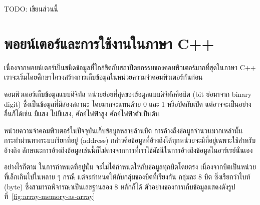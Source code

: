 TODO: เขียน{\wbr}ส่วน{\wbr}นี้{\wbr}

\section{พอยน์เตอร์และ{\wbr}การ{\wbr}ใช้{\wbr}งาน{\wbr}ใน{\wbr}ภาษา C++}
\label{sect:array-pointer-c}

เนื่องจาก{\wbr}พอยน์เตอร์{\wbr}เป็น{\wbr}ชนิด{\wbr}ข้อมูล{\wbr}ที่{\wbr}ใกล้ชิด{\wbr}กับ{\wbr}สถาปัตยกรรม{\wbr}ของ{\wbr}คอมพิวเตอร์{\wbr}มาก{\wbr}ที่สุด{\wbr}ใน{\wbr}ภาษา{\wbr}
C++ เรา{\wbr}จะ{\wbr}เริ่ม{\wbr}โดย{\wbr}ศึกษา{\wbr}โครงสร้าง{\wbr}การ{\wbr}เก็บ{\wbr}ข้อมูล{\wbr}ใน{\wbr}หน่วยความจำ{\wbr}คอมพิวเตอร์{\wbr}กัน{\wbr}ก่อน{\wbr}

คอมพิวเตอร์{\wbr}เก็บ{\wbr}ข้อมูล{\wbr}แบบ{\wbr}ดิจิทัล หน่วย{\wbr}ย่อย{\wbr}ที่สุด{\wbr}ของ{\wbr}ข้อมูล{\wbr}แบบ{\wbr}ดิจิทัล{\wbr}คือ{\wbr}บิต (bit ย่อ{\wbr}มา{\wbr}จาก{\wbr}
binary digit) ซึ่ง{\wbr}เป็น{\wbr}ข้อมูล{\wbr}ที่{\wbr}มี{\wbr}สอง{\wbr}สถานะ โดยมาก{\wbr}จะ{\wbr}แทน{\wbr}ด้วย 0 และ 1 หรือ{\wbr}ปิด{\wbr}กับ{\wbr}เปิด{\wbr}
แต่{\wbr}อาจ{\wbr}จะ{\wbr}เป็น{\wbr}อย่าง{\wbr}อื่น{\wbr}ก็ได้{\wbr}เช่น มี{\wbr}แสง ไม่{\wbr}มี{\wbr}แสง, ศักย์{\wbr}ไฟฟ้า{\wbr}สูง ศักย์{\wbr}ไฟฟ้า{\wbr}ต่ำ{\wbr}เป็นต้น{\wbr}

หน่วยความจำ{\wbr}คอมพิวเตอร์{\wbr}ใน{\wbr}ปัจจุบัน{\wbr}เก็บ{\wbr}ข้อมูล{\wbr}หลาย{\wbr}ล้าน{\wbr}บิต{\wbr}
การ{\wbr}อ้าง{\wbr}ถึง{\wbr}ข้อมูล{\wbr}จำนวน{\wbr}มาก{\wbr}เหล่านั้น{\wbr}กระทำ{\wbr}ผ่าน{\wbr}ทาง{\wbr}ระบบ{\wbr}เรียก{\wbr}ที่อยู่ (address)
กล่าวคือ{\wbr}ข้อมูล{\wbr}ที่{\wbr}อ้าง{\wbr}ถึง{\wbr}ได้{\wbr}ทุก{\wbr}หน่วย{\wbr}จะ{\wbr}มี{\wbr}ที่อยู่{\wbr}เฉพาะ{\wbr}ใช้{\wbr}สำหรับ{\wbr}อ้าง{\wbr}ถึง{\wbr}
ลักษณะ{\wbr}การ{\wbr}อ้าง{\wbr}ถึง{\wbr}ข้อมูล{\wbr}เช่นนี้{\wbr}ก็{\wbr}ไม่{\wbr}ต่าง{\wbr}จาก{\wbr}การ{\wbr}ที่{\wbr}เรา{\wbr}ใช้{\wbr}ดัชนี{\wbr}ใน{\wbr}การ{\wbr}อ้าง{\wbr}ถึง{\wbr}ข้อมูล{\wbr}ใน{\wbr}อาร์เรย์{\wbr}นั่นเอง{\wbr}

อย่างไรก็ตาม ใน{\wbr}การ{\wbr}กำหนด{\wbr}ที่อยู่{\wbr}นั้น จะ{\wbr}ไม่{\wbr}ได้{\wbr}กำหนด{\wbr}ให้{\wbr}กับ{\wbr}ข้อมูล{\wbr}ทุก{\wbr}บิต{\wbr}โดย{\wbr}ตรง{\wbr}
เนื่องจาก{\wbr}บิต{\wbr}เป็น{\wbr}หน่วย{\wbr}ที่{\wbr}เล็ก{\wbr}เกิน{\wbr}ไป{\wbr}ใน{\wbr}หลาย ๆ กรณี แต่{\wbr}จะ{\wbr}กำหนด{\wbr}ให้{\wbr}กับ{\wbr}กลุ่ม{\wbr}ของ{\wbr}บิต{\wbr}ที่{\wbr}เรียง{\wbr}กัน{\wbr}
กลุ่ม{\wbr}ละ 8 บิต ซึ่ง{\wbr}เรียก{\wbr}ว่า{\wbr}ไบท์ (byte) ซึ่ง{\wbr}สามารถ{\wbr}พิจารณา{\wbr}เป็น{\wbr}เลขฐานสอง 8 หลัก{\wbr}ก็ได้{\wbr}
ตัวอย่าง{\wbr}ของ{\wbr}การ{\wbr}เก็บ{\wbr}ข้อมูล{\wbr}แสดง{\wbr}ดัง{\wbr}รูป{\wbr}ที่~\ref{fig:array-memory-as-array}

